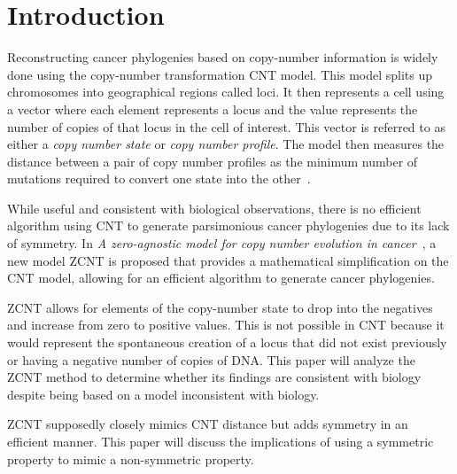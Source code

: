 \section{Introduction}

Reconstructing cancer phylogenies based on copy-number information is widely done using the copy-number transformation CNT model. This model splits up chromosomes into geographical regions called loci. It then represents a cell using a vector where each element represents a locus and the value represents the number of copies of that locus in the cell of interest. This vector is referred to as either a {\it copy number state\/} or {\it copy number profile}. The model then measures the distance between a pair of copy number profiles as the minimum number of mutations required to convert one state into the other~\cite{cnt_paper}. 

While useful and consistent with biological observations, there is no efficient algorithm using CNT to generate parsimonious cancer phylogenies due to its lack of symmetry. In {\it A zero-agnostic model for copy number evolution in cancer\/}~\cite{zcnt_paper}, a new model ZCNT is proposed that provides a mathematical simplification on the CNT model, allowing for an efficient algorithm to generate cancer phylogenies.

ZCNT allows for elements of the copy-number state to drop into the negatives and increase from zero to positive values. This is not possible in CNT because it would represent the spontaneous creation of a locus that did not exist previously or having a negative number of copies of DNA\@. This paper will analyze the ZCNT method to determine whether its findings are consistent with biology despite being based on a model inconsistent with biology. 

ZCNT supposedly closely mimics CNT distance but adds symmetry in an efficient manner. This paper will discuss the implications of using a symmetric property to mimic a non-symmetric property. 